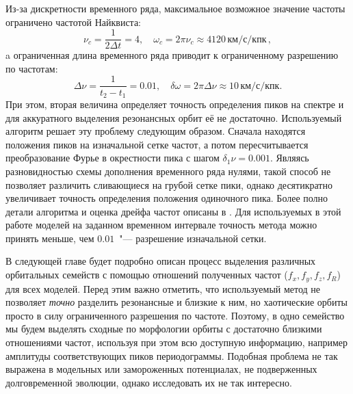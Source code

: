 \documentclass{trlnotes}
\begin{document}
Из-за дискретности временного ряда, максимальное возможное значение частоты ограничено частотой Найквиста: 
\[
  ν_c = \frac{1}{2 Δt} = 4, \quad ω_c = 2\pi ν_c \approx 4120\,\text{км}/\text{с}/\text{кпк}\,,
\]
a ограниченная длина временного ряда приводит к ограниченному разрешению по частотам: 
\[
  Δν = \frac{1}{t_2 - t_1} = 0.01, \quad δω = 2\pi Δν \approx 10\,\text{км}/\text{с}/\text{кпк}.
\]
При этом, вторая величина определяет точность определения пиков на спектре и для аккуратного выделения резонансных
орбит её не достаточно. Используемый алгоритм решает эту проблему следующим образом. Сначала находятся положения пиков на изначальной сетке частот, а потом пересчитывается  преобразование Фурье в окрестности пика с шагом $δ_1ν = 0.001$. Являясь
разновидностью схемы дополнения временного ряда нулями, такой способ не позволяет различить сливающиеся на грубой сетке
пики, однако десятикратно увеличивает точность определения положения одиночного пика. Более полно детали алгоритма
и оценка дрейфа частот описаны в \citet{parul2020}. Для  используемых в этой работе моделей на заданном временном
интервале точность метода можно принять меньше, чем $0.01$~"--- разрешение изначальной сетки.

В следующей главе будет подробно описан процесс выделения различных орбитальных семейств с помощью отношений
полученных частот ($f_x, f_y, f_z, f_R$) для всех моделей. Перед этим важно отметить, что используемый метод не
позволяет \emph{точно} разделить резонансные и близкие к ним, но хаотические орбиты просто в силу ограниченного
разрешения по частоте. Поэтому, в одно семейство мы будем выделять сходные по морфологии орбиты с достаточно
близкими отношениями частот, используя при этом всю доступную информацию, например амплитуды соответствующих пиков
периодограммы. Подобная проблема не так выражена в модельных или замороженных потенциалах, не подверженных
долговременной эволюции, однако исследовать их не так
интересно.  
\end{document}
